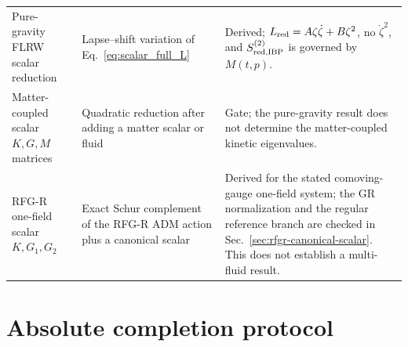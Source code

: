 \documentclass[11pt,a4paper]{article}
\begin{document}
\begin{table}[H]
{\begin{tabular}{@{}p{}p{}p{}@{}}
Pure-gravity FLRW scalar reduction & Lapse--shift variation of Eq.~\eqref{eq:scalar_full_L} & Derived; \(L_{\rm red}=A\zeta\dot\zeta+B\zeta^2\), no \(\dot\zeta^2\), and \(S_{\rm red,IBP}^{(2)}\) is governed by \(M(t,p)\). \\
Matter-coupled scalar \(K,G,M\) matrices & Quadratic reduction after adding a matter scalar or fluid & Gate; the pure-gravity result does not determine the matter-coupled kinetic eigenvalues. \\
RFG-R one-field scalar \(K,G_1,G_2\) & Exact Schur complement of the RFG-R ADM action plus a canonical scalar & Derived for the stated comoving-gauge one-field system; the GR normalization and the regular reference branch are checked in Sec.~\ref{sec:rfgr-canonical-scalar}. This does not establish a multi-fluid result. \\
\bottomrule
\end{tabular}%
}
\end{table}

\begin{table}[H]
\centering
\caption{Derivation map for the central equations (continued).}
\label{tab:derivation-map-continued}
\end{table}

\section{Absolute completion protocol}
\end{document}
